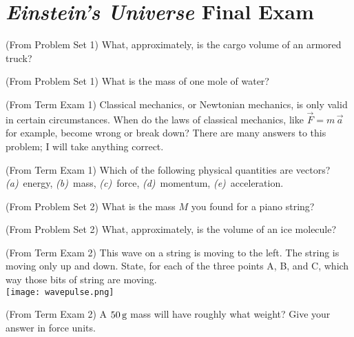 \documentclass[12pt, letterpaper]{article}
\begin{document}
\section*{\textsl{Einstein's Universe} Final Exam}
\setcounter{problem}{1}

\begin{problem}
  (From Problem Set 1)
  What, approximately, is the cargo volume of an armored truck?
\end{problem}

\begin{problem}
  (From Problem Set 1)
  What is the mass of one mole of water?
\end{problem}

\begin{problem}
  (From Term Exam 1)
  Classical mechanics, or Newtonian mechanics, is only valid in certain
circumstances. When do the laws of classical mechanics, like $\vec{F} =
m\,\vec{a}$ for example, become wrong or break down? There are many answers
to this problem; I will take anything correct.
\end{problem}

\begin{problem}
  (From Term Exam 1)
  Which of the following physical quantities are vectors?
\\
\textsl{(a)}~energy,
\textsl{(b)}~mass,
\textsl{(c)}~force,
\textsl{(d)}~momentum,
\textsl{(e)}~acceleration.
\end{problem}

\begin{problem}
  (From Problem Set 2)
  What is the mass $M$ you found for a piano string?
\end{problem}

\begin{problem}
  (From Problem Set 2)
  What, approximately, is the volume of an ice molecule?
\end{problem}

\begin{problem}
  (From Term Exam 2)
  This wave on a string is moving to the left. The string is moving only
up and down. State, for each of the three points A, B, and C, which way those
bits of string are moving.\\
\texttt{[image: wavepulse.png]}
\end{problem}

\begin{problem}
  (From Term Exam 2)
  A $50\,\mathrm{g}$ mass will have roughly what weight? Give your answer in force units.
\end{problem}
\end{document}
